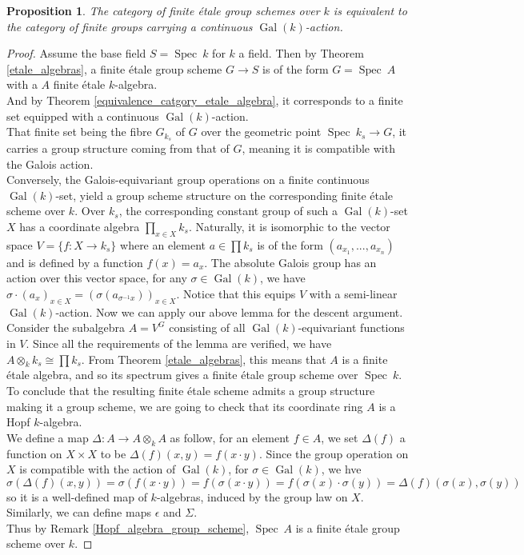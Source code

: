 \documentclass{article}
\theoremstyle{plain}
\newtheorem{proposition}[theorem]{Proposition}
\theoremstyle{definition}
\DeclareMathOperator{\Spec}{Spec}
\DeclareMathOperator{\Gal}{Gal}
\begin{document}
\begin{proposition}
    The category of finite \'etale group schemes over $k$ is equivalent to the category of finite groups carrying a continuous $\Gal(k)$-action.
\end{proposition}
\begin{proof}
    Assume the base field $S = \Spec\:k$ for $k$ a field.
    Then by Theorem \ref{etale_algebras}, a finite \'etale group scheme $G\rightarrow S$ is of the form $G = \Spec\: A$ with a $A$ finite \'etale $k$-algebra.\\
    And by Theorem \ref{equivalence_catgory_etale_algebra}, it corresponds to a finite set equipped with a continuous $\Gal(k)$-action.\\
    That finite set being the fibre $G_{k_s}$ of $G$ over the geometric point $\Spec \: k_s \rightarrow G$, it carries a group structure coming from that of $G$, meaning it is compatible with the Galois action.\\
    Conversely, the Galois-equivariant group operations on a finite continuous $\Gal(k)$-set, yield a group scheme structure on the corresponding  finite \'etale scheme over $k$.
    Over $k_s$, the corresponding constant group of such a $\Gal(k)$-set $X$ has a coordinate algebra $\prod_{x\in X} k_s$.
    Naturally, it is isomorphic to the vector space $V = \{f:X\rightarrow k_s\}$ where an element $a\in \prod k_s$ is of the form $(a_{x_1},...,a_{x_n})$ and is defined by a function $f(x) = a_x$. 
    The absolute Galois group has an action over this vector space, for any $\sigma\in \Gal(k)$, we have $\sigma\cdot (a_x)_{x\in X} = (\sigma(a_{\sigma^{-1}x}))_{x\in X}$.
    Notice that this equips $V$ with a semi-linear $\Gal(k)$-action.
    Now we can apply our above lemma for the descent argument. 
    Consider the subalgebra $A = V^G$ consisting of all $\Gal(k)$-equivariant functions in $V$.
    Since all the requirements of the lemma are verified, we have $A\otimes_k k_s \cong \prod k_s$.
    From Theorem \ref{etale_algebras}, this means that $A$ is a finite \'etale algebra, and so its spectrum gives a finite \'etale group scheme over $\Spec\: k$.\\
    To conclude that the resulting finite \'etale scheme admits a group structure making it a group scheme, we are going to check that its coordinate ring $A$ is a Hopf $k$-algebra.\\
    We define a map $\Delta:A\rightarrow A\otimes_k A$ as follow, 
    for an element $f\in A$, we set $\Delta(f)$ a function on $X\times X$ to be $\Delta(f)(x,y) = f(x\cdot y)$.
    Since the group operation on $X$ is compatible with the action of $\Gal(k)$, for $\sigma\in\Gal(k)$, we hve
    $$\sigma (\Delta(f)(x,y)) = \sigma (f(x\cdot y)) = f(\sigma (x\cdot y)) = f(\sigma(x)\cdot \sigma(y)) = \Delta(f)(\sigma(x),\sigma(y))$$
    so it is a well-defined map of $k$-algebras, induced by the group law on $X$.
    Similarly, we can define maps $\epsilon$ and $\Sigma$.\\
    Thus by Remark \ref{Hopf_algebra_group_scheme}, $\Spec\:A$ is a finite \'etale group scheme over $k$.
\end{proof}
\end{document}
